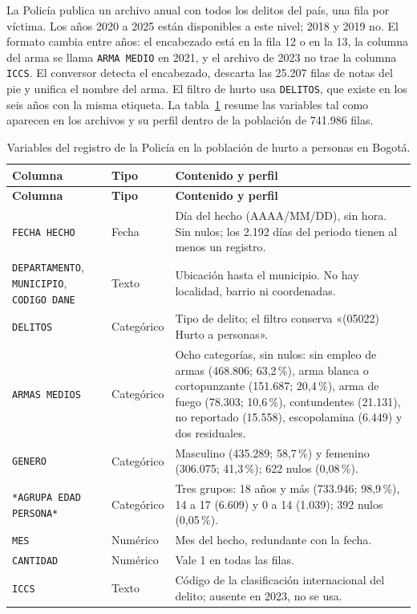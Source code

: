 \documentclass[12pt,letterpaper]{article}
\begin{document}
La Policía publica un archivo anual con todos los delitos del país, una fila por víctima. Los años 2020 a 2025 están disponibles a este nivel; 2018 y 2019 no. El formato cambia entre años: el encabezado está en la fila 12 o en la 13, la columna del arma se llama \texttt{ARMA MEDIO} en 2021, y el archivo de 2023 no trae la columna \texttt{ICCS}. El conversor detecta el encabezado, descarta las 25.207 filas de notas del pie y unifica el nombre del arma. El filtro de hurto usa \texttt{DELITOS}, que existe en los seis años con la misma etiqueta. La tabla~\ref{tab:variables-policia} resume las variables tal como aparecen en los archivos y su perfil dentro de la población de 741.986 filas.

{\small
\setlength{\tabcolsep}{4pt}
\begin{longtable}{@{}>{\raggedright\arraybackslash}p{3.3cm}>{\raggedright\arraybackslash}p{1.8cm}>{\raggedright\arraybackslash}p{10.2cm}@{}}
\caption{Variables del registro de la Policía en la población de hurto a personas en Bogotá.}\label{tab:variables-policia}\\
\toprule
\textbf{Columna} & \textbf{Tipo} & \textbf{Contenido y perfil} \\
\midrule
\endfirsthead
\toprule
\textbf{Columna} & \textbf{Tipo} & \textbf{Contenido y perfil} \\
\midrule
\endhead
\bottomrule
\endfoot
\texttt{FECHA HECHO} & Fecha & Día del hecho (AAAA/MM/DD), sin hora. Sin nulos; los 2.192 días del periodo tienen al menos un registro. \\
\texttt{DEPARTAMENTO}, \texttt{MUNICIPIO}, \texttt{CODIGO DANE} & Texto & Ubicación hasta el municipio. No hay localidad, barrio ni coordenadas. \\
\texttt{DELITOS} & Categórico & Tipo de delito; el filtro conserva «(05022) Hurto a personas». \\
\texttt{ARMAS MEDIOS} & Categórico & Ocho categorías, sin nulos: sin empleo de armas (468.806; 63,2\,\%), arma blanca o cortopunzante (151.687; 20,4\,\%), arma de fuego (78.303; 10,6\,\%), contundentes (21.131), no reportado (15.558), escopolamina (6.449) y dos residuales. \\
\texttt{GENERO} & Categórico & Masculino (435.289; 58,7\,\%) y femenino (306.075; 41,3\,\%); 622 nulos (0,08\,\%). \\
\texttt{*AGRUPA EDAD PERSONA*} & Categórico & Tres grupos: 18 años y más (733.946; 98,9\,\%), 14 a 17 (6.609) y 0 a 14 (1.039); 392 nulos (0,05\,\%). \\
\texttt{MES} & Numérico & Mes del hecho, redundante con la fecha. \\
\texttt{CANTIDAD} & Numérico & Vale 1 en todas las filas. \\
\texttt{ICCS} & Texto & Código de la clasificación internacional del delito; ausente en 2023, no se usa. \\
\end{longtable}
}
\end{document}

